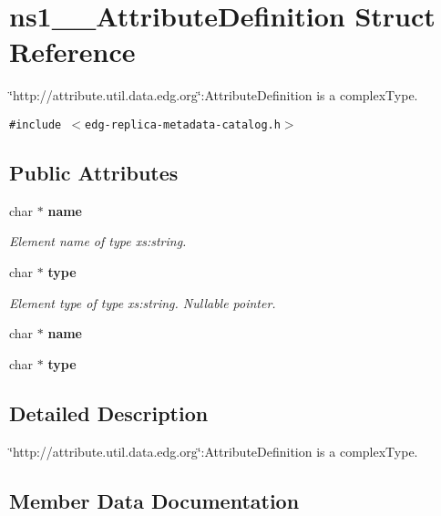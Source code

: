 \section{ns1\_\-\_\-Attribute\-Definition Struct Reference}
\label{structns1____AttributeDefinition}
\char`\"{}http://attribute.util.data.edg.org\char`\"{}:Attribute\-Definition is a complex\-Type.  


{\tt \#include $<$edg-replica-metadata-catalog.h$>$}

\subsection*{Public Attributes}
\begin{CompactItemize}
\item 
char $\ast$ \bf{name}
\begin{CompactList}\small\item\em Element name of type xs:string. \item\end{CompactList}\item 
char $\ast$ \bf{type}\label{structns1____AttributeDefinition_3842a8b7c81b1a6318d2bd4e5f5ef54f}

\begin{CompactList}\small\item\em Element type of type xs:string. Nullable pointer. \item\end{CompactList}\item 
char $\ast$ \textbf{name}\label{structns1____AttributeDefinition_8c8228f233c0472df79a636b549dfb7a}

\item 
char $\ast$ \textbf{type}\label{structns1____AttributeDefinition_3842a8b7c81b1a6318d2bd4e5f5ef54f}

\end{CompactItemize}


\subsection{Detailed Description}
\char`\"{}http://attribute.util.data.edg.org\char`\"{}:Attribute\-Definition is a complex\-Type. 



\subsection{Member Data Documentation}
